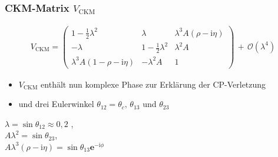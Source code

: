 \documentclass[hyperref={pdfpagelabels=false}]{beamer}
\begin{document}
\begin{frame}
 \frametitle{CKM-Matrix $V_\text{CKM}$}
 \pause
 \begin{itemize}
 \end{itemize}
 
 \begin{align*}
 V_{\text{CKM}} = \begin{pmatrix}
			    1-\frac12\lambda^2 & \lambda & \lambda^3A(\rho-\text{i}\eta)\\
			    -\lambda & 1-\frac12 \lambda^2 &\lambda^2A\\
			    \lambda^3A(1-\rho-\text{i}\eta) &-\lambda^2A & 1
			    \end{pmatrix} \, +  \, \mathcal{O}(\lambda^4)
\end{align*}
\begin{itemize}
 \item $V_{\text{CKM}}$ enthält nun komplexe Phase zur Erklärung der CP-Verletzung
 \item und drei Eulerwinkel $\theta_{12} = \theta_c,\, \theta_{13}$ und $\theta_{23}$
\end{itemize}

\vspace{0.4cm}
\small{$\lambda = \sin\theta_{12} \approx 0,2$ ,\\ $A\lambda^2 = \sin\theta_{23}$, \\ $A\lambda^3(\rho-\text{i}\eta) = \sin\theta_{13}\mathbf{e}^{-\text{i}\phi}$}
\end{frame}
\end{document}
